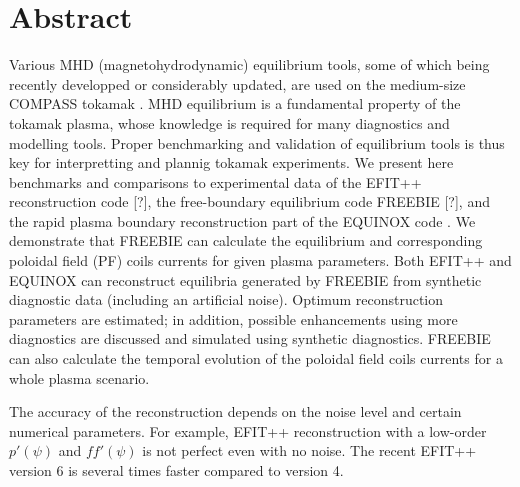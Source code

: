 \section{Abstract}

Various MHD (magnetohydrodynamic) equilibrium tools, some of which being recently developped or considerably updated, are used on the medium-size COMPASS tokamak \cite{P_nek_2006}. MHD equilibrium is a fundamental property of the tokamak plasma, whose knowledge is required for many diagnostics and modelling tools. Proper benchmarking and validation of equilibrium tools is thus key for interpretting and plannig tokamak experiments. We present here benchmarks and comparisons to experimental data of the EFIT++ reconstruction code [?], the free-boundary equilibrium code FREEBIE [?], and the rapid plasma boundary reconstruction part of the EQUINOX code \cite{doi:10.1016/j.jcp.2011.04.005}. We demonstrate that FREEBIE can calculate the equilibrium and corresponding poloidal field (PF) coils currents for given plasma parameters. Both EFIT++ and EQUINOX can reconstruct equilibria generated by FREEBIE from synthetic diagnostic data (including an artificial noise). Optimum reconstruction parameters are estimated; in addition, possible enhancements using more diagnostics are discussed and simulated using synthetic diagnostics. FREEBIE can also calculate the temporal evolution of the poloidal field coils currents for a whole plasma scenario.

The accuracy of the reconstruction depends on the noise level and certain numerical parameters. For example, EFIT++ reconstruction with a low-order $p'\left(\psi\right)$ and $ff'\left(\psi\right)$ is not perfect even with no noise. The recent EFIT++ version 6 is several times faster compared to version 4.